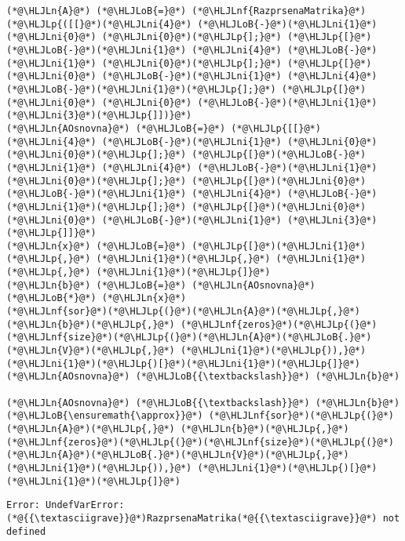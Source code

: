 \documentclass[12pt,a4paper]{article}
\newcommand{\HLJLn}[1]{#1}
\newcommand{\HLJLnf}[1]{\textcolor[RGB]{66,102,213}{#1}}
\newcommand{\HLJLni}[1]{\textcolor[RGB]{59,151,46}{#1}}
\newcommand{\HLJLoB}[1]{\textcolor[RGB]{102,102,102}{\textbf{#1}}}
\newcommand{\HLJLp}[1]{#1}
\begin{document}
\begin{lstlisting}
(*@\HLJLn{A}@*) (*@\HLJLoB{=}@*) (*@\HLJLnf{RazprsenaMatrika}@*)(*@\HLJLp{([[}@*)(*@\HLJLni{4}@*) (*@\HLJLoB{-}@*)(*@\HLJLni{1}@*) (*@\HLJLni{0}@*) (*@\HLJLni{0}@*)(*@\HLJLp{];}@*) (*@\HLJLp{[}@*)(*@\HLJLoB{-}@*)(*@\HLJLni{1}@*) (*@\HLJLni{4}@*) (*@\HLJLoB{-}@*)(*@\HLJLni{1}@*) (*@\HLJLni{0}@*)(*@\HLJLp{];}@*) (*@\HLJLp{[}@*)(*@\HLJLni{0}@*) (*@\HLJLoB{-}@*)(*@\HLJLni{1}@*) (*@\HLJLni{4}@*) (*@\HLJLoB{-}@*)(*@\HLJLni{1}@*)(*@\HLJLp{];}@*) (*@\HLJLp{[}@*)(*@\HLJLni{0}@*) (*@\HLJLni{0}@*) (*@\HLJLoB{-}@*)(*@\HLJLni{1}@*) (*@\HLJLni{3}@*)(*@\HLJLp{]])}@*)
(*@\HLJLn{AOsnovna}@*) (*@\HLJLoB{=}@*) (*@\HLJLp{[[}@*)(*@\HLJLni{4}@*) (*@\HLJLoB{-}@*)(*@\HLJLni{1}@*) (*@\HLJLni{0}@*) (*@\HLJLni{0}@*)(*@\HLJLp{];}@*) (*@\HLJLp{[}@*)(*@\HLJLoB{-}@*)(*@\HLJLni{1}@*) (*@\HLJLni{4}@*) (*@\HLJLoB{-}@*)(*@\HLJLni{1}@*) (*@\HLJLni{0}@*)(*@\HLJLp{];}@*) (*@\HLJLp{[}@*)(*@\HLJLni{0}@*) (*@\HLJLoB{-}@*)(*@\HLJLni{1}@*) (*@\HLJLni{4}@*) (*@\HLJLoB{-}@*)(*@\HLJLni{1}@*)(*@\HLJLp{];}@*) (*@\HLJLp{[}@*)(*@\HLJLni{0}@*) (*@\HLJLni{0}@*) (*@\HLJLoB{-}@*)(*@\HLJLni{1}@*) (*@\HLJLni{3}@*)(*@\HLJLp{]]}@*)
(*@\HLJLn{x}@*) (*@\HLJLoB{=}@*) (*@\HLJLp{[}@*)(*@\HLJLni{1}@*)(*@\HLJLp{,}@*) (*@\HLJLni{1}@*)(*@\HLJLp{,}@*) (*@\HLJLni{1}@*)(*@\HLJLp{,}@*) (*@\HLJLni{1}@*)(*@\HLJLp{]}@*)
(*@\HLJLn{b}@*) (*@\HLJLoB{=}@*) (*@\HLJLn{AOsnovna}@*) (*@\HLJLoB{*}@*) (*@\HLJLn{x}@*)
(*@\HLJLnf{sor}@*)(*@\HLJLp{(}@*)(*@\HLJLn{A}@*)(*@\HLJLp{,}@*) (*@\HLJLn{b}@*)(*@\HLJLp{,}@*) (*@\HLJLnf{zeros}@*)(*@\HLJLp{(}@*)(*@\HLJLnf{size}@*)(*@\HLJLp{(}@*)(*@\HLJLn{A}@*)(*@\HLJLoB{.}@*)(*@\HLJLn{V}@*)(*@\HLJLp{,}@*) (*@\HLJLni{1}@*)(*@\HLJLp{)),}@*) (*@\HLJLni{1}@*)(*@\HLJLp{)[}@*)(*@\HLJLni{1}@*)(*@\HLJLp{]}@*)
(*@\HLJLn{AOsnovna}@*) (*@\HLJLoB{{\textbackslash}}@*) (*@\HLJLn{b}@*)

(*@\HLJLn{AOsnovna}@*) (*@\HLJLoB{{\textbackslash}}@*) (*@\HLJLn{b}@*) (*@\HLJLoB{\ensuremath{\approx}}@*) (*@\HLJLnf{sor}@*)(*@\HLJLp{(}@*)(*@\HLJLn{A}@*)(*@\HLJLp{,}@*) (*@\HLJLn{b}@*)(*@\HLJLp{,}@*) (*@\HLJLnf{zeros}@*)(*@\HLJLp{(}@*)(*@\HLJLnf{size}@*)(*@\HLJLp{(}@*)(*@\HLJLn{A}@*)(*@\HLJLoB{.}@*)(*@\HLJLn{V}@*)(*@\HLJLp{,}@*) (*@\HLJLni{1}@*)(*@\HLJLp{)),}@*) (*@\HLJLni{1}@*)(*@\HLJLp{)[}@*)(*@\HLJLni{1}@*)(*@\HLJLp{]}@*)
\end{lstlisting}

\begin{lstlisting}
Error: UndefVarError: (*@{{\textasciigrave}}@*)RazprsenaMatrika(*@{{\textasciigrave}}@*) not defined
\end{lstlisting}
\end{document}

